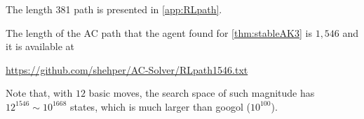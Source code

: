 The length 381 path is presented in \autoref{app:RLpath}.

The length of the AC path that the agent found for \autoref{thm:stableAK3} is $1,546$ and it is available at
\begin{center}
	\href{https://github.com/shehper/AC-Solver/RLpath1546.txt}{https://github.com/shehper/AC-Solver/RLpath1546.txt}
\end{center}
Note that, with $12$ basic moves, the search space of such magnitude has $12^{1546} \sim 10^{1668}$ states, which is much larger than googol ($10^{100}$).
